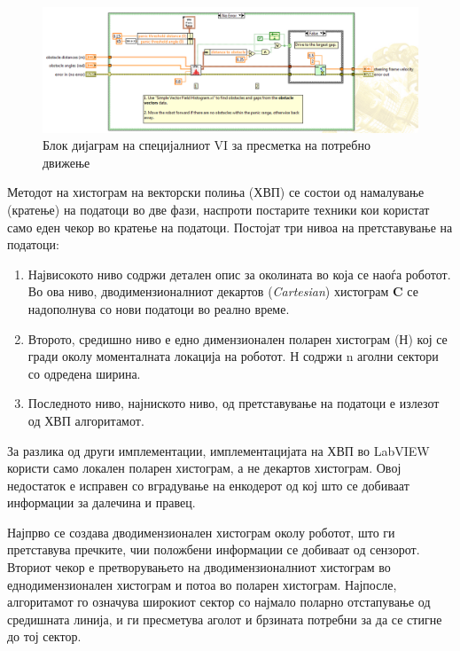 \documentclass[11pt]{article}
\begin{document}
    \begin{figure}[H]
      \centering
      \includegraphics[width=\linewidth]{./images/dani_roaming_calc.png}
      \caption{Блок дијаграм на специјалниот VI за пресметка на потребно движење}
      \label{fig:dani_roaming_calc.png}
      \end{figure}

    \bigbreak

    Методот на хистограм на векторски полиња (ХВП) се состои од намалување (кратење) на податоци во две фази, наспроти постарите техники кои користат само еден чекор во кратење на податоци. Постојат три нивоа на претставување на податоци:

    \begin{enumerate}
      \item Највисокото ниво содржи детален опис за околината во која се наоѓа роботот. Во ова ниво, дводимензионалниот декартов (\textit{Cartesian}) хистограм \textbf{C} се надополнува со нови податоци во реално време.
      \item Второто, средишно ниво е едно димензионален поларен хистограм (Н) кој се гради околу моменталната локација на роботот. Н содржи n аголни сектори со одредена ширина.
      \item Последното ниво, најниското ниво, од претставување на податоци е излезот од ХВП алгоритамот.
      \end{enumerate}

    За разлика од други имплементации, имплементацијата на ХВП во LabVIEW користи само локален поларен хистограм, а не декартов хистограм. Овој недостаток е исправен со вградување на енкодерот од кој што се добиваат информации за далечина и правец.

    Најпрво се создава дводимензионален хистограм околу роботот, што ги претставува пречките, чии положбени информации се добиваат од сензорот. Вториот чекор е претворувањето на дводимензионалниот хистограм во еднодимензионален хистограм и потоа во поларен хистограм. Најпосле, алгоритамот го означува широкиот сектор со најмало поларно отстапување од средишната линија, и ги пресметува аголот и брзината потребни за да се стигне до тој сектор.
\end{document}
